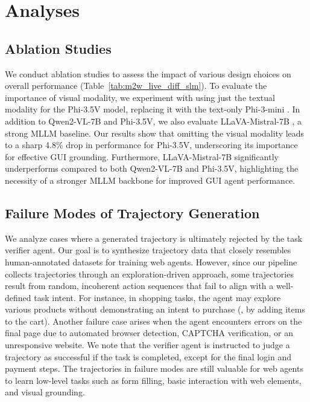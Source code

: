 \section{Analyses}



\subsection{Ablation Studies}
We conduct ablation studies to assess the impact of various design choices on overall performance (Table~\ref{tab:m2w_live_diff_slm}).
To evaluate the importance of visual modality, we experiment with using just the textual modality for the Phi-3.5V model, replacing it with the text-only Phi-3-mini \cite{abdin2024phi}. In addition to Qwen2-VL-7B and Phi-3.5V, we also evaluate LLaVA-Mistral-7B \cite{DBLP:conf/nips/LiuLWL23a}, a strong MLLM baseline.
Our results show that omitting the visual modality leads to a sharp 4.8\% drop in performance for Phi-3.5V, underscoring its importance for effective GUI grounding.
Furthermore, LLaVA-Mistral-7B significantly underperforms compared to both Qwen2-VL-7B and Phi-3.5V, highlighting the necessity of a stronger MLLM backbone for improved GUI agent performance.



\subsection{Failure Modes of Trajectory Generation}
We analyze cases where a generated trajectory is ultimately rejected by the task verifier agent. 
Our goal is to synthesize trajectory data that closely resembles human-annotated datasets for training web agents.
However, since our pipeline collects trajectories through an exploration-driven approach, some trajectories result from random, incoherent action sequences that fail to align with a well-defined task intent.
For instance, in shopping tasks, the agent may explore various products without demonstrating an intent to purchase (\eg, by adding items to the cart).
Another failure case arises when the agent encounters errors on the final page due to automated browser detection, CAPTCHA verification, or an unresponsive website.
We note that the verifier agent is instructed to judge a trajectory as successful if the task is completed, except for the final login and payment steps.
The trajectories in failure modes are still valuable for web agents to learn low-level tasks such as form filling, basic interaction with web elements, and visual grounding.


